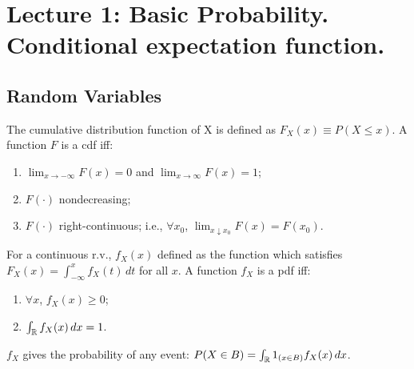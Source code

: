 \documentclass[DIV=14,titlepage=false]{scrreprt}
\begin{document}
\vspace{-10pt}
\chapter{Lecture 1: Basic Probability. Conditional expectation function.}
\section{Random Variables}

\begin{definition}
  The cumulative distribution function of X is  defined as $ F_X(x) \equiv P(X \leq x) $. 
  A function $ F $ is a cdf iff:
  \begin{enumerate}
  \item $ \lim_{x \to -\infty} F(x) = 0 $ and $ \lim_{x \to \infty} F(x) = 1 $;
  \item $ F (\cdot) $ nondecreasing;
  \item $ F (\cdot) $ right-continuous; i.e., $ \forall x_0 $, $ \lim_{x \downarrow x_0} F(x) = F(x_0) $.
  \end{enumerate}
\end{definition}
\vspace{5pt}
\begin{definition}
  For a continuous r.v., $ f_X (x) $ defined as the function which satisfies $ F_X(x) = \int_{-\infty}^{x} f_X(t) \, dt $ for all $ x $. A function $ f_X $ is a pdf iff:
  \begin{enumerate}
  \item $ \forall x $, $ f_X(x) \geq 0 $;
  \item $ \int_{\mathbb{R}} f_X(x) \, dx = 1 $.
  \end{enumerate}
\end{definition}
\vspace{5pt}
$ f_X $ gives the probability of any event: $ P (X \in B) = \int_{\mathbb{R}} 1_{(x \in B)} f_X(x) \, dx $.
\end{document}
